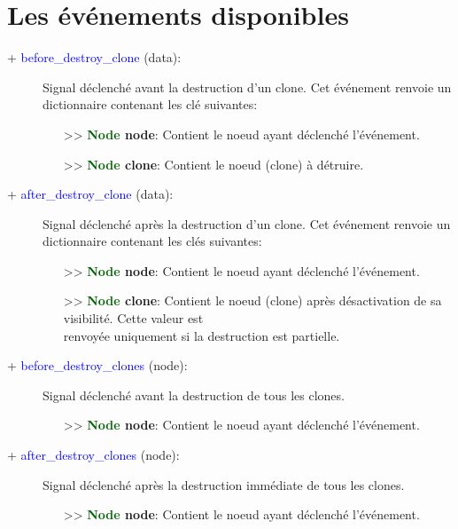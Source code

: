 \documentclass[a4paper, 11pt]{article}
\begin{document}
	\newpage \section{Les événements disponibles}
	\begin{description}
		\item [+ \textcolor{blue}{before\_destroy\_clone} (data):] Signal déclenché avant la destruction 
		d'un clone. Cet événement renvoie un dictionnaire contenant les clé suivantes:
		\begin{itemize}
			\item [>> \textbf{\textcolor{darkgreen}{Node} node}:] Contient le noeud ayant déclenché
			l'événement.
			\item [>> \textbf{\textcolor{darkgreen}{Node} clone}:] Contient le noeud (clone) à détruire.\\
		\end{itemize}
	\end{description}
	\begin{description}
		\item [+ \textcolor{blue}{after\_destroy\_clone} (data):] Signal déclenché après la destruction d'un 
		clone. Cet événement renvoie un dictionnaire contenant les clés suivantes:
		\begin{itemize}
			\item [>> \textbf{\textcolor{darkgreen}{Node} node}:] Contient le noeud ayant déclenché 
			l'événement.
			\item [>> \textbf{\textcolor{darkgreen}{Node} clone}:] Contient le noeud (clone) après 
			désactivation de sa visibilité. Cette valeur est \\renvoyée uniquement si la destruction est 
			partielle.\\
		\end{itemize}
	\end{description}
	\begin{description}
		\item [+ \textcolor{blue}{before\_destroy\_clones} (node):] Signal déclenché avant la destruction de 
		tous les clones.
		\begin{itemize}
			\item [>> \textbf{\textcolor{darkgreen}{Node} node}:] Contient le noeud ayant déclenché 
			l'événement.\\
		\end{itemize}
	\end{description}
	\begin{description}
		\item [+ \textcolor{blue}{after\_destroy\_clones} (node):] Signal déclenché après la destruction 
		immédiate de tous les clones. 
		\begin{itemize}
			\item [>> \textbf{\textcolor{darkgreen}{Node} node}:] Contient le noeud ayant déclenché 
			l'événement.\\
		\end{itemize}
	\end{description}
\end{document}
